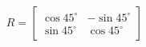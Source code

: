 \documentclass[preview]{standalone}
\begin{document}
\begin{align*}
R = \begin{bmatrix} \cos 45^\circ & -\sin 45^\circ \\ \sin 45^\circ & \cos 45^\circ \end{bmatrix}
\end{align*}
\end{document}
